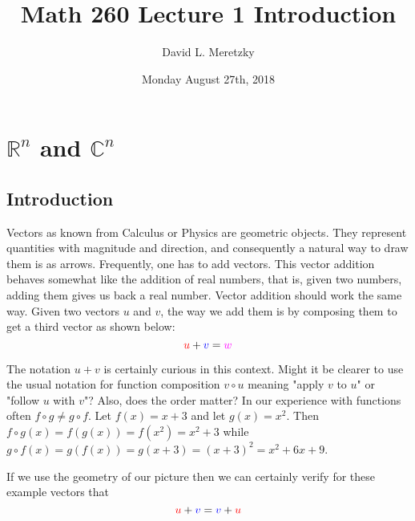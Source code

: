 \documentclass{article}
\title{ \vspace{-10ex} %
Math 260 Lecture 1 Introduction
}
\author{David L. Meretzky
}
\date{%
Monday August 27th, 2018
}
\theoremstyle{problemstyle}
\begin{document}
\maketitle

\section{$\mathbb{R}^n$ and $\mathbb{C}^n$}

\subsection{Introduction}

Vectors as known from Calculus or Physics are geometric objects. They represent quantities with magnitude and direction, and consequently a natural way to draw them is as arrows. 
Frequently, one has to add vectors. This vector addition behaves somewhat like the addition of real numbers, that is, given two numbers, adding them gives us back a real number. Vector addition should work the same way.  Given two vectors $u$ and $v$, the way we add them is by composing them to get a third vector as shown below:  $$\textcolor{red}{u} + \textcolor{blue}{v} = \textcolor{purple}{w}$$ 

\begin{center}
\end{center}

The notation $u+v$ is certainly curious in this context. Might it be clearer to use the usual notation for function composition $v\circ u$ meaning "apply $v$ to $u$" or "follow $u$ with $v$"? Also, does the order matter? In our experience with functions often $f \circ g \neq g \circ f$. Let $f(x) = x + 3$ and let $g(x) = x^2$. Then $f\circ g (x) = f(g(x)) = f(x^2) = x^2 + 3$ while $g \circ f (x) = g(f(x)) = g(x+3) = (x+3)^2 = x^2 + 6x + 9$. 

If we use the geometry of our picture then we can certainly verify for these example vectors that $$\textcolor{red}{u} + \textcolor{blue}{v} = \textcolor{blue}{v}+\textcolor{red}{u}$$
\end{document}
